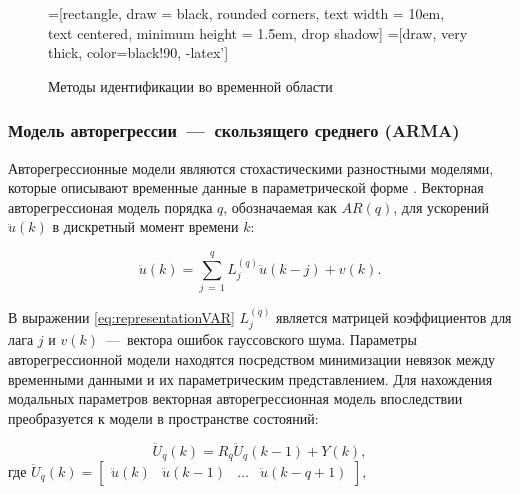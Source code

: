 \begin{figure}[H]
	\centering
	=[rectangle, draw = black, rounded corners, text width = 10em, text centered, minimum height = 1.5em, drop shadow]
	=[draw, very thick, color=black!90, -latex']
	\caption{Методы идентификации во временной области}\label{fig:schemeTimeDomainOMA}
\end{figure}

\subsubsection{Модель авторегрессии~---~скользящего среднего (ARMA)}

Авторегрессионные модели являются стохастическими разностными моделями, которые описывают временные данные в параметрической форме \cite{lib:oma:Chen}. Векторная авторегрессионая модель порядка $ q $, обозначаемая как $ AR(q) $, для ускорений $ \ddot{u}(k) $ в дискретный момент времени $ k $:

\begin{equation}
	\ddot{u}(k) = \sum_{j\,=\,1} ^ q L_j^{(q)} \ddot{u}(k - j) + v(k). \label{eq:representationVAR}
\end{equation}

В выражении \eqref{eq:representationVAR} $ L_j^{(q)} $ является матрицей коэффициентов для лага $ j $ и $ v(k) $~---~вектора ошибок гауссовского шума. Параметры авторегрессионной модели находятся посредством минимизации невязок между временными данными и их параметрическим представлением. Для нахождения модальных параметров векторная авторегрессионная модель впоследствии преобразуется к модели в пространстве состояний:

\begin{equation}
	\ddot{U}_q(k) = R_q \ddot{U}_q(k - 1) + Y(k),
\end{equation} 
где $ \ddot{U}_q(k) = \begin{bmatrix} \ddot{u}(k) & \ddot{u}(k - 1) & \dots & \ddot{u}(k - q + 1) \end{bmatrix}, $

